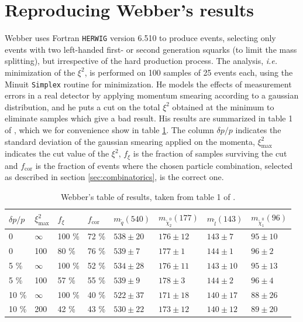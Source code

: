 \documentclass[twoside,english]{uiofysmaster}
\begin{document}
\section{Reproducing Webber's results}
Webber uses Fortran {\tt HERWIG} version 6.510 \cite{Corcella:2000bw,Moretti:2002eu} to produce events, selecting only events with two left-handed first- or second generation squarks (to limit the mass splitting), but irrespective of the hard production process. The analysis, {\it i.e.} minimization of the $\xi^2$, is performed on 100 samples of 25 events each, using the Minuit {\tt Simplex} \cite{James:1975dr} routine for minimization. He models the effects of measurement errors in a real detector by applying momentum smearing according to a gaussian distribution, and he puts a cut on the total $\xi^2$ obtained at the minimum to eliminate samples which give a bad result. His results are summarized in table 1 of \cite{Webber:2009vm}, which we for convenience show in table \ref{table:webber_original}. The column $\delta p/p$ indicates the standard deviation of the gaussian smearing applied on the momenta, $\xi^2_\mathrm{max}$ indicates the cut value of the $\xi^2$, $f_\xi$ is the fraction of samples surviving the cut and $f_\mathrm{cor}$ is the fraction of events where the chosen particle combination, selected as described in section \ref{sec:combinatorics}, is the correct one. 


\begin{table}[hbt]
	\centering
	\begin{tabular}{| l | l | l | l  || l | l | l | l |}
		\hline
		$\delta p/p$ & $\xi^2_\mathrm{max}$ & $f_\xi$ & $f_\mathrm{cor}$ & $m_{\tilde q} (540)$ & $m_{\tilde \chi_2^0} (177)$ & $m_{\tilde l} (143)$ & $m_{\tilde \chi_1^0} (96)$ \\
		\hline \hline
		0 & 	$\infty$ &	100 \%	& 72 \%	& $538 \pm 20$	&	$176 \pm 12$	&	$143 \pm 7$	& 	$95 \pm 10$	\\
		0 &		100 &		80 \%	& 76 \% & $539 \pm 7$	&	$177 \pm 1$		&	$144 \pm 1$	&	$96 \pm 2$	\\
		5 \% &	$\infty$ &	100 \%	& 52 \% & $534 \pm 28$	& 	$176 \pm 11$	&	$143 \pm 10$&	$95 \pm 13$ \\
		5 \% &	100 &		57 \%	& 55 \% & $539 \pm 9$	&	$178 \pm 3$		& 	$144 \pm 2$	&	$96 \pm 4$	\\
		10 \% &	$\infty$ &	100 \%	& 40 \% & $522 \pm 37$	&	$171 \pm 18$	&	$140 \pm 17$&	$88 \pm 26$	\\
		10 \% &	200 &		42 \%	& 43 \% & $530 \pm 22$	& 	$173 \pm 12$	&	$140 \pm 12$&	$89 \pm 20$ \\
		\hline
	\end{tabular}
	\caption{Webber's table of results, taken from table 1 of \cite{Webber:2009vm}.}
	\label{table:webber_original}
\end{table}
\end{document}
